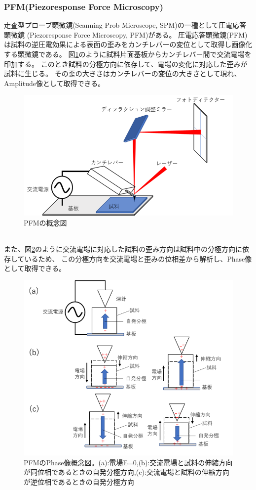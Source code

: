\documentclass[dvipdfmx,12pt,a4paper]{jreport}
\begin{document}
		\subsubsection{PFM(Piezoresponse Force Microscopy)}
		走査型プローブ顕微鏡(Scanning Prob Microscope, SPM)の一種として圧電応答顕微鏡
		(Piezoresponse Force Microscopy, PFM)がある。
		圧電応答顕微鏡(PFM)は試料の逆圧電効果による表面の歪みをカンチレバーの変位として取得し画像化する顕微鏡である。
		図\ref{PFMの概念図}のように試料片面基板からカンチレバー間で交流電場を印加する。
		このとき試料の分極方向に依存して、電場の変化に対応した歪みが試料に生じる。
		その歪の大きさはカンチレバーの変位の大きさとして現れ、
		Amplitude像として取得できる。
		\begin{figure}[h]
			\centering
			\includegraphics{PFM.png}
			\caption{PFMの概念図}
			\label{PFMの概念図}
		\end{figure}
		\\
		また、図\ref{PFM_phaseの概念図}のように交流電場に対応した試料の歪み方向は試料中の分極方向に依存しているため、
		この分極方向を交流電場と歪みの位相差から解析し、Phase像として取得できる。
		\begin{figure}[h]
			\centering
			\includegraphics[width=0.8\linewidth]{PFM_phase.png}
			\caption{PFMのPhase像概念図。(a):電場E=0,(b):交流電場と試料の伸縮方向が同位相であるときの自発分極方向,(c):交流電場と試料の伸縮方向が逆位相であるときの自発分極方向}
			\label{PFM_phaseの概念図}
		\end{figure}
\end{document}
